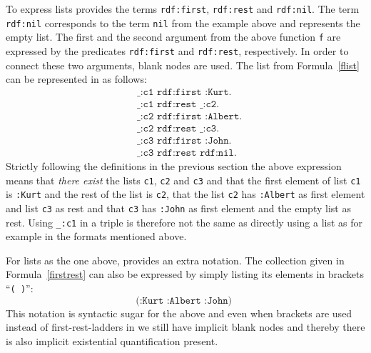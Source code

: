 To express lists \rdf provides the terms \texttt{rdf:first}, \texttt{rdf:rest} and \texttt{rdf:nil}. 
The term \texttt{rdf:nil} corresponds to the term \texttt{nil} from the example above and represents the empty list. The first and the second argument from the above function 
\texttt{f} are expressed by the predicates \texttt{rdf:first} and \texttt{rdf:rest}, respectively. In order to connect these two arguments, blank nodes are used. The list 
from Formula~\ref{flist} can be represented in \rdf as follows:
% 
% 
\begin{equation}\label{firstrest}
\begin{split}
&\texttt{\_:c1 rdf:first :Kurt.}\\
&\texttt{\_:c1 rdf:rest \_:c2.}\\
&\texttt{\_:c2 rdf:first :Albert.}\\
&\texttt{\_:c2 rdf:rest \_:c3.}\\
&\texttt{\_:c3 rdf:first :John.}\\
&\texttt{\_:c3 rdf:rest rdf:nil.}  
\end{split}
\end{equation}
Strictly following the definitions in the previous section the above expression means that \emph{there exist} the lists \texttt{c1}, \texttt{c2} and \texttt{c3} 
and that the first element of list \texttt{c1} is \texttt{:Kurt} and the 
rest of the list is \texttt{c2}, that the list \texttt{c2} has \texttt{:Albert} as first element and list \texttt{c3} as rest and that \texttt{c3} has \texttt{:John} 
as first element and the empty list as 
rest. Using \texttt{\_:c1} in a triple is therefore not the same as directly using a list as for example in the formats mentioned above.

For lists as the one above, \rdf provides an extra notation. The collection given in Formula~\ref{firstrest} can also be expressed by simply listing its elements in brackets ``\texttt{( )}'':
\begin{equation}
\texttt{(:Kurt :Albert :John) } 
\end{equation}
This notation is syntactic sugar for the above and even when brackets are used instead of first-rest-ladders in \rdf we still have implicit blank nodes and thereby there is also implicit 
existential quantification present.

